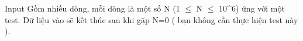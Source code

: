 Input
Gồm nhiều dòng, mỗi dòng là một số N (1  $\le$  N  $\le$  10^6) ứng với một test. Dữ liệu vào sẽ kết thúc sau khi gặp N=0 ( bạn không cần thực hiện test này ).